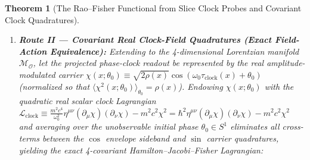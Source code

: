 \documentclass[11pt, a4paper]{article}
\newtheorem{theorem}{Theorem}[section]
\theoremstyle{definition}
\begin{document}
\begin{theorem}[The Rao--Fisher Functional from Slice Clock Probes and Covariant Clock Quadratures]
\begin{enumerate}[label=(\roman*)]
\begin{equation}
    \end{equation}
    which is positive-definite on $\mathbb{R}^3$. Since $\nabla\ln f_t = \nabla\ln\rho_{\text{inv}}$ and $Z(t)I_F[f_t] = \int_{\Sigma_{\mathcal{O}}} \rho_{\text{inv}}|\nabla\ln\rho_{\text{inv}}|^2 d^3x$, the differential KL Hessian limit ($\epsilon \to 0$) yields the exact unnormalized slice Fisher functional:
    \begin{equation}
    \label{eq:kl_fisher_expansion}
    \begin{aligned}
    \mathcal{E}_{\text{Fisher}}[\rho_{\text{inv}}] &\equiv Z(t)\,m^2 c^2 \lim_{\epsilon \to 0} \frac{1}{\epsilon^2}\left\langle D_{\text{KL}}^{\Sigma_{\mathcal{O}}}\big(f_t(\mathbf{x}) \,\|\, f_t(\mathbf{x} + \epsilon\,\delta\mathbf{x})\big) \right\rangle_{(S^1)^3} \\
    &= \frac{1}{2} Z(t)\,m^2 c^2 \langle \delta x^i \delta x^j \rangle_{(S^1)^3} I_{ij}[f_t] \\
    &= \frac{\hbar^2}{4}\int_{\Sigma_{\mathcal{O}}} d^3x\,\rho_{\text{inv}}(\mathbf{x}, t)|\nabla\ln\rho_{\text{inv}}(\mathbf{x}, t)|^2,
    \end{aligned}
    \end{equation}
    fixing $\lambda = \hbar^2/4$ (and non-relativistic Bohm energy $\frac{\mathcal{E}_{\text{Fisher}}}{2m} = \frac{\hbar^2}{8m}\int \rho_{\text{inv}}|\nabla\ln\rho_{\text{inv}}|^2 d^3x$), which vanishes in the formal classical limit $\hbar \to 0 \iff \ell_C \to 0$ at fixed $m, c$.
    \item \textbf{Route II --- Covariant Real Clock-Field Quadratures (Exact Field-Action Equivalence):} Extending to the 4-dimensional Lorentzian manifold $\mathcal{M}_{\mathcal{O}}$, let the projected phase-clock readout be represented by the real amplitude-modulated carrier $\chi(x; \theta_0) \equiv \sqrt{2\rho(x)}\cos(\omega_0\tau_{\text{clock}}(x) + \theta_0)$ (normalized so that $\langle \chi^2(x; \theta_0) \rangle_{\theta_0} = \rho(x)$). Endowing $\chi(x; \theta_0)$ with the quadratic real scalar clock Lagrangian $\mathcal{L}_{\text{clock}} \equiv \frac{m^2 c^4}{\omega_0^2}\eta^{\mu\nu}(\partial_\mu \chi)(\partial_\nu \chi) - m^2 c^2 \chi^2 = \hbar^2 \eta^{\mu\nu}(\partial_\mu \chi)(\partial_\nu \chi) - m^2 c^2 \chi^2$ and averaging over the unobservable initial phase $\theta_0 \in S^1$ eliminates all cross-terms between the $\cos$ envelope sideband and $\sin$ carrier quadratures, yielding the exact 4-covariant Hamilton--Jacobi--Fisher Lagrangian:
    \begin{equation}
    \label{eq:sideband_averaged_lagrangian}

\end{equation}
\end{enumerate}
\end{theorem}
\end{document}
